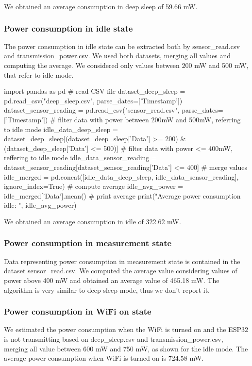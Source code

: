 We obtained an average consumption in deep sleep of 59.66 mW.

\subsubsection{Power consumption in idle state}
The power consumption in idle state can be extracted both by sensor\_read.csv and transmission\_power.csv. We used both datasets, merging all values and computing the average. We considered only values between 200 mW and 500 mW, that refer to idle mode.
\begin{python}
import pandas as pd 
# read CSV file 
dataset_deep_sleep = pd.read_csv("deep_sleep.csv", parse_dates=['Timestamp'])
dataset_sensor_reading = pd.read_csv("sensor_read.csv", parse_dates=['Timestamp'])
# filter data with power between 200mW and 500mW, referring to idle mode
idle_data_deep_sleep = dataset_deep_sleep[(dataset_deep_sleep['Data'] >= 200) & (dataset_deep_sleep['Data'] <= 500)]
# filter data with power <= 400mW, reffering to idle mode
idle_data_sensor_reading = dataset_sensor_reading[dataset_sensor_reading['Data'] <= 400]
# merge values 
idle_merged = pd.concat([idle_data_deep_sleep, idle_data_sensor_reading], ignore_index=True)
# compute average
idle_avg_power = idle_merged['Data'].mean()
# print average 
print("Average power consumption idle: ", idle_avg_power)
\end{python}

We obtained an average consumption in idle of 322.62 mW.

\subsubsection{Power consumption in measurement state}
Data representing power consumption in measurement state is contained in the dataset sensor\_read.csv. We computed the average value considering values of power above 400 mW and obtained an average value of 465.18 mW. The algorithm is very similar to deep sleep mode, thus we don't report it.

\subsubsection{Power consumption in WiFi on state}
We estimated the power consumption when the WiFi is turned on and the ESP32 is not transmitting based on deep\_sleep.csv and transmission\_power.csv, merging all value between 600 mW and 750 mW, as shown for the idle mode. The average power consumption when WiFi is turned on is 724.58 mW.

